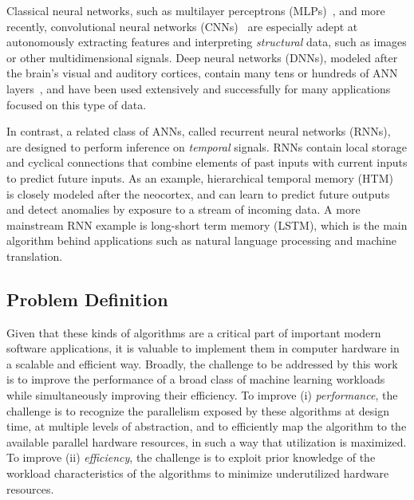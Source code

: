 Classical neural networks, such as multilayer perceptrons (MLPs)~\cite{rosenblatt1961principles}, and more recently, convolutional neural networks (CNNs)~\cite{lecun1999object} are especially adept at autonomously extracting features and interpreting \textit{structural} data, such as images or other multidimensional signals.
Deep neural networks (DNNs), modeled after the brain's visual and auditory cortices, contain many tens or hundreds of ANN layers~\cite{lee2009convolutional, simonyan2014very, sermanet2013overfeat, szegedy2015going, krizhevsky2012imagenet}, and have been used extensively and successfully for many applications focused on this type of data.

In contrast, a related class of ANNs, called recurrent neural networks (RNNs), are designed to perform inference on \textit{temporal} signals.
RNNs contain local storage and cyclical connections that combine elements of past inputs with current inputs to predict future inputs.
As an example, hierarchical temporal memory (HTM)~\cite{ahmad2015properties, mnatzaganian2017mathematical} is closely modeled after the neocortex, and can learn to predict future outputs and detect anomalies by exposure to a stream of incoming data.
A more mainstream RNN example is long-short term memory (LSTM), which is the main algorithm behind applications such as natural language processing and machine translation.

\subsection{Problem Definition}

Given that these kinds of algorithms are a critical part of important modern software applications, it is valuable to implement them in computer hardware in a scalable and efficient way.
Broadly, the challenge to be addressed by this work is to improve the performance of a broad class of machine learning workloads while simultaneously improving their efficiency.
To improve (i) \textit{performance}, the challenge is to recognize the parallelism exposed by these algorithms at design time, at multiple levels of abstraction, and to efficiently map the algorithm to the available parallel hardware resources, in such a way that utilization is maximized.
To improve (ii) \textit{efficiency}, the challenge is to exploit prior knowledge of the workload characteristics of the algorithms to minimize underutilized hardware resources.

